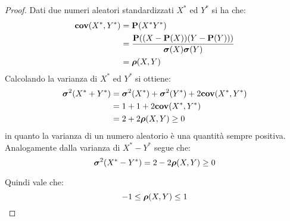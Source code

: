 \begin{proof}
  Dati due numeri aleatori standardizzati $X^*$ ed $Y^*$ si ha che:
  \begin{align*}
    \cov(X^*, Y^*) &= \pr(X^* Y^*) \\ %
    &= \frac{\pr((X - \pr(X))(Y - \pr(Y)))}{\sqm(X)\sqm(Y)} \\
    &= \cc(X,Y)
  \end{align*}
  Calcolando la varianza di $X^*$ ed $Y^*$ si ottiene:
  \begin{align*}
    \boldsymbol\sigma^2(X^* + Y^*) &= \boldsymbol\sigma^2(X^*) + \boldsymbol\sigma^2(Y^*) + 2 \mathbf{cov}(X^*, Y^*) \\
    &= 1 + 1 + 2 \mathbf{cov}(X^*, Y^*) \\
    &= 2 + 2\boldsymbol\rho(X,Y) \ge 0
  \end{align*}
  in quanto la varianza di un numero aleatorio è una quantità sempre positiva. Analogamente dalla varianza di \( X^* - Y^* \) segue che:
  \[ \boldsymbol\sigma^2(X^* - Y^*) = 2 - 2\boldsymbol\rho(X,Y) \ge 0 \]

  Quindi vale che:
  \[ -1 \le \boldsymbol\rho(X,Y) \le 1 \]
\end{proof}

